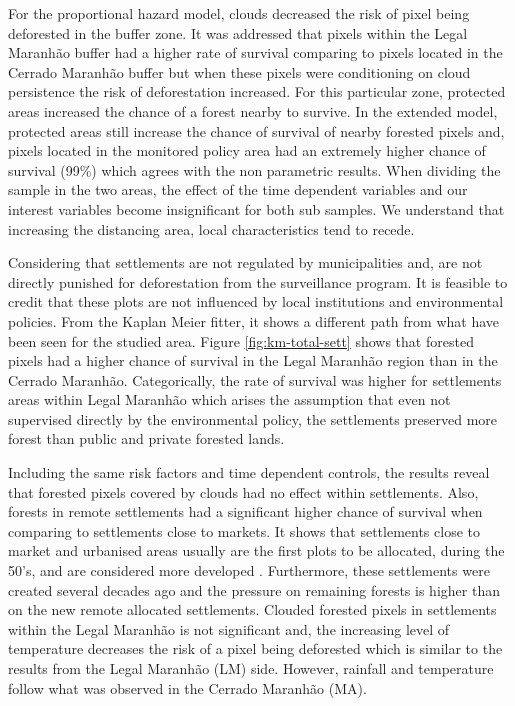 For the proportional hazard model, clouds decreased the risk of pixel being deforested in the buffer zone. It was addressed that pixels within the Legal Maranhão buffer had a higher rate of survival comparing to pixels located in the Cerrado Maranhão buffer but when these pixels were conditioning on cloud persistence the risk of deforestation increased. For this particular zone, protected areas increased the chance of a forest nearby to survive. In the extended model, protected areas still increase the chance of survival of nearby forested pixels and, pixels located in the monitored policy area had an extremely higher chance of survival (99\%) which agrees with the non parametric results. When dividing the sample in the two areas, the effect of the time dependent variables and our interest variables become insignificant for both sub samples. We understand that increasing the distancing area, local characteristics tend to recede. 

Considering that settlements are not regulated by municipalities and, are not directly punished for deforestation from the surveillance program. It is feasible to credit that these plots are not influenced by local institutions and environmental policies. From the Kaplan Meier fitter, it shows a different path from what have been seen for the studied area. Figure \ref{fig:km-total-sett} shows that forested pixels had a higher chance of survival in the Legal Maranhão region than in the Cerrado Maranhão. Categorically, the rate of survival was higher for settlements areas within Legal Maranhão which arises the assumption that even not supervised directly by the environmental policy, the settlements preserved more forest than public and private forested lands. 


Including the same risk factors and time dependent controls, the results reveal that forested pixels covered by clouds had no effect within settlements. Also, forests in remote settlements had a significant higher chance of survival when comparing to settlements close to markets. It shows that settlements close to market and urbanised areas usually are the first plots to be allocated, during the 50's, and are considered more developed \citep[p.~12]{alencar_2016}. Furthermore, these settlements were created several decades ago and the pressure on remaining forests is higher than on the new remote allocated settlements. Clouded forested pixels in settlements within the Legal Maranhão is not significant and, the increasing level of temperature decreases the risk of a pixel being deforested which is similar to the results from the Legal Maranhão (LM) side. However, rainfall and temperature follow what was observed in the Cerrado Maranhão (MA).

